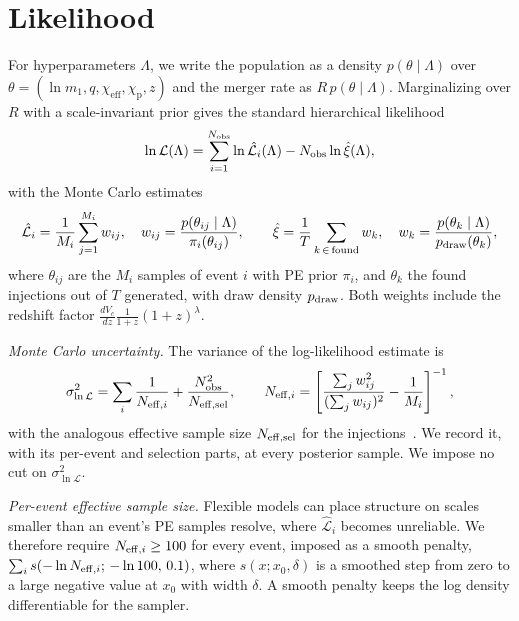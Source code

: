 \documentclass[%
 reprint,
 amsmath,amssymb,
 aps,
 prl,
 nofootinbib,nobibnotes,
 floatfix,
]{revtex4-2}
\newcommand{\chieff}{\ensuremath{\chi_{\mathrm{eff}}}}
\newcommand{\chip}{\ensuremath{\chi_{\mathrm{p}}}}
\begin{document}
\section{Likelihood}
\label{sm: likelihood}

For hyperparameters $\Lambda$, we write the population as a density $p(\theta \mid \Lambda)$ over $\theta = (\ln m_1, q, \chieff, \chip, z)$ and the merger rate as $R\, p(\theta \mid \Lambda)$. Marginalizing over $R$ with a scale-invariant prior gives the standard hierarchical likelihood~\cite{Mandel:2018mve, Thrane:2018qnx}
\begin{equation}
    \ln \mathcal{L}(\Lambda) = \sum_{i=1}^{N_{\rm obs}} \ln \hat{\mathcal{L}}_i(\Lambda) - N_{\rm obs} \ln \hat{\xi}(\Lambda),
\end{equation}
with the Monte Carlo estimates
\begin{equation}
    \hat{\mathcal{L}}_i = \frac{1}{M_i} \sum_{j=1}^{M_i} w_{ij}, \quad w_{ij} = \frac{p(\theta_{ij} \mid \Lambda)}{\pi_i(\theta_{ij})}, \qquad
    \hat{\xi} = \frac{1}{T} \sum_{k\,\in\,\rm found} w_k, \quad w_k = \frac{p(\theta_k \mid \Lambda)}{p_{\rm draw}(\theta_k)},
\end{equation}
where $\theta_{ij}$ are the $M_i$ samples of event $i$ with \ac{PE} prior $\pi_i$, and $\theta_k$ the found injections out of $T$ generated, with draw density $p_{\rm draw}$. Both weights include the redshift factor $\frac{dV_c}{dz} \frac{1}{1+z} (1 + z)^{\lambda}$.

\textit{Monte Carlo uncertainty.} The variance of the log-likelihood estimate is
\begin{equation}
    \sigma^2_{\ln \mathcal{L}} = \sum_i \frac{1}{N_{{\rm eff}, i}} + \frac{N_{\rm obs}^2}{N_{\rm eff, sel}}, \qquad
    N_{{\rm eff}, i} = \left[\frac{\sum_j w_{ij}^2}{(\sum_j w_{ij})^2} - \frac{1}{M_i}\right]^{-1},
\end{equation}
with the analogous effective sample size $N_{\rm eff, sel}$ for the injections~\cite{Farr:2019rap, Essick:2022ojx, Talbot:2023pex}. We record it, with its per-event and selection parts, at every posterior sample. We impose no cut on $\sigma^2_{\ln\mathcal{L}}$.

\textit{Per-event effective sample size.} Flexible models can place structure on scales smaller than an event's \ac{PE} samples resolve, where $\hat{\mathcal{L}}_i$ becomes unreliable. We therefore require $N_{{\rm eff}, i} \geq 100$ for every event, imposed as a smooth penalty, $\sum_i s(-\ln N_{{\rm eff}, i};\, -\ln 100,\, 0.1)$, where $s(x; x_0, \delta)$ is a smoothed step from zero to a large negative value at $x_0$ with width $\delta$. A smooth penalty keeps the log density differentiable for the sampler.
\end{document}
